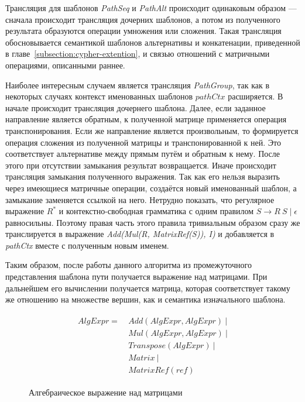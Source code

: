\documentclass[14pt]{matmex-diploma-custom}
\begin{document}
Трансляция для шаблонов \textit{PathSeq} и \textit{PathAlt} происходит одинаковым образом --- сначала происходит трансляция дочерних шаблонов, а потом из полученного результата образуются операции умножения или сложения. Такая трансляция обосновывается семантикой шаблонов альтернативы и конкатенации, приведенной в главе~\ref{subsection:cypher-extention}, и связью отношений с матричными операциями, описанными раннее.

Наиболее интересным случаем является трансляция \textit{Path\-Group}, так как в некоторых случаях контекст именованных шаблонов $pathCtx$ расширяется. В начале происходит трансляция дочернего шаблона. Далее, если заданное направление является обратным, к полученной матрице применяется операция транспонирования. Если же направление является произвольным, то формируется операция сложения из полученной матрицы и транспонированной к ней. Это соответствует альтернативе между прямым путём и обратным к нему. После этого при отсутствии замыкания результат возвращается. Иначе происходит трансляция замыкания полученного выражения. Так как его нельзя выразить через имеющиеся матричные операции, создаётся новый именованный шаблон, а замыкание заменяется ссылкой на него. Нетрудно показать, что регулярное выражение $R^*$ и контекстно-свободная грамматика с одним правилом $S \rightarrow R~S \mid \epsilon$ равносильны. Поэтому правая часть этого правила тривиальным образом сразу же транслируется в выражение \textit{Add(Mul(R, MatrixRef(S)), I)} и добавляется в \textit{pathCtx} вместе с полученным новым именем.

Таким образом, после работы данного алгоритма из промежуточного представления шаблона пути получается выражение над матрицами. При дальнейшем его вычислении получается матрица, которая соответствует такому же отношению на множестве вершин, как и семантика изначального шаблона.



\begin{figure}[H]
\begin{align*}
\begin{split}
AlgExpr= ~ &Add(AlgExpr, AlgExpr)~|\\
           &Mul(AlgExpr, AlgExpr)~|\\
           &Transpose(AlgExpr)~|\\
           &Matrix~|\\
           &MatrixRef(ref)
\end{split}
\end{align*}
\caption{Алгебраическое выражение над матрицами}
\label{fig:alg-expr}
\end{figure}
\end{document}
